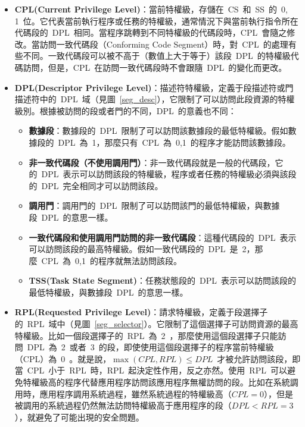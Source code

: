 \begin{itemize}
\item{\textbf{CPL(Current Privilege Level)}}：當前特權級，存儲在~CS~和~SS~的~0, 1~位。它代表當前執行程序或任務的特權級，通常情況下與當前執行指令所在代碼段的~DPL~相同。當程序跳轉到不同特權級的代碼段時，CPL~會隨之修改。當訪問一致代碼段（Conforming Code Segment）時，對~CPL~的處理有些不同。一致代碼段可以被不高于（數值上大于等于）該段~DPL~的特權級代碼訪問，但是，CPL~在訪問一致代碼段時不會跟隨~DPL~的變化而更改。

\item{\textbf{DPL(Descriptor Privilege Level)}}：描述符特權級，定義于段描述符或門描述符中的~DPL~域（見圖~\ref{seg_desc}），它限制了可以訪問此段資源的特權級別。根據被訪問的段或者門的不同，DPL~的意義也不同：
  \begin{itemize}
  \item{\textbf{數據段}}：數據段的~DPL~限制了可以訪問該數據段的最低特權級。假如數據段的~DPL~為~1，那麼只有~CPL~為~0,1~的程序才能訪問該數據段。
  \item{\textbf{非一致代碼段（不使用調用門）}}：非一致代碼段就是一般的代碼段，它的~DPL~表示可以訪問該段的特權級，程序或者任務的特權級必須與該段的~DPL~完全相同才可以訪問該段。
  \item{\textbf{調用門}}：調用門的~DPL~限制了可以訪問該門的最低特權級，與數據段~DPL~的意思一樣。
  \item{\textbf{一致代碼段和使用調用門訪問的非一致代碼段}}：這種代碼段的~DPL~表示可以訪問該段的最高特權級。假如一致代碼段的~DPL~是~2，那麼~CPL~為~0,1~的程序就無法訪問該段。
  \item{\textbf{TSS(Task State Segment)}}：任務狀態段的~DPL~表示可以訪問該段的最低特權級，與數據段~DPL~的意思一樣。
  \end{itemize}

\item{\textbf{RPL(Requested Privilege Level)}}：請求特權級，定義于段選擇子的~RPL~域中（見圖~\ref{seg_selector}）。它限制了這個選擇子可訪問資源的最高特權級。比如一個段選擇子的~RPL~為~2~，那麼使用這個段選擇子只能訪問~DPL~為~2~或者~3~的段，即使使用這個段選擇子的程序當前特權級（CPL）為~0~。就是說，$\max{(CPL, RPL)}\le DPL$~才被允許訪問該段，即當~CPL~小于~RPL~時，RPL~起決定性作用，反之亦然。使用~RPL~可以避免特權級高的程序代替應用程序訪問該應用程序無權訪問的段。比如在系統調用時，應用程序調用系統過程，雖然系統過程的特權級高（$CPL=0$），但是被調用的系統過程仍然無法訪問特權級高于應用程序的段（$DPL<RPL=3$），就避免了可能出現的安全問題。
\end{itemize}

